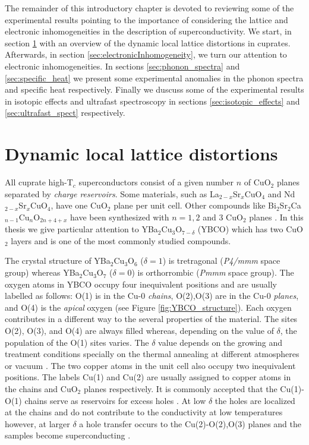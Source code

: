 The remainder of this introductory chapter is devoted to reviewing some of the experimental results pointing to the importance of considering the lattice and electronic inhomogeneities in the description of superconductivity. 
We start, in section \ref{sec:dynamicDistortions} with an overview of the dynamic local lattice distortions in cuprates. 
Afterwards, in section \ref{sec:electronicInhomogeneity}, we turn our attention to electronic inhomogeneities. 
In sections \ref{sec:phonon_spectra} and \ref{sec:specific_heat} we present some experimental anomalies in the phonon spectra and specific heat respectively.
Finally we duscuss some of the experimental results in isotopic effects and ultrafast spectroscopy in sections \ref{sec:isotopic_effects} and \ref{sec:ultrafast_spect} respectively.


\section{Dynamic local lattice distortions}
\label{sec:dynamicDistortions}

All cuprate high-T$_c$ superconductors consist of a given number $n$ of CuO$_2$ planes separated by \textit{charge reservoirs}.
Some materials, such as La$_{2-x}$Sr$_x$CuO$_4$ and Nd$_{2-x}$Sr$_x$CuO$_4$, have one CuO$_2$ plane per unit cell. 
Other compounds like Bi$_2$Sr$_2$Ca$_{n-1}$Cu$_n$O$_{2n+4+x}$ have been synthesized with $n=1,2$ and 3 CuO$_2$ planes \cite{Basov2005}.
In this thesis we give particular attention to YBa$_2$Cu$_3$O$_{7-\delta}$ (YBCO) which has two CuO$_2$ layers and is one of the most commonly studied compounds.

The crystal structure of YBa$_2$Cu$_3$O$_6$ ($\delta=1$) is tretragonal (\textit{P4/mmm} space group) whereas YBa$_2$Cu$_3$O$_7$ ($\delta=0$) is orthorrombic (\textit{Pmmm} space group).
The oxygen atoms in YBCO occupy four inequivalent positions and are usually labelled as follows: O(1) is in the Cu-0 \textit{chains}, O(2),O(3) are in the Cu-0 \textit{planes}, and O(4) is the \textit{apical} oxygen (see Figure \ref{fig:YBCO_structure}).
Each oxygen contributes in a different way to the several properties of the material.
The sites O(2), O(3), and O(4) are always filled whereas, depending on the value of $\delta$, the population of the O(1) sites varies.
The $\delta$ value depends on the growing and treatment conditions specially on the thermal annealing at different atmospheres or vacuum \cite{Ivanov1995}.
The two copper atoms in the unit cell also occupy two inequivalent positions.
The labels Cu(1) and Cu(2) are usually assigned to copper atoms in the chains and CuO$_2$ planes respectively.
It is commonly accepted that the Cu(1)-O(1) chains serve as reservoirs for excess holes \cite{Pickett1989}. 
At low $\delta$ the holes are localized at the chains and do not contribute to the conductivity at low temperatures however,
at larger $\delta$ a hole transfer occurs to the Cu(2)-O(2),O(3) planes and the samples become superconducting \cite{Cava1988}.

